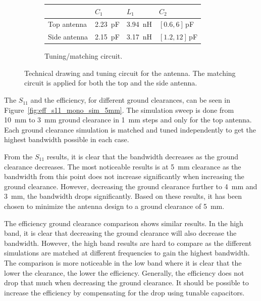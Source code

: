 \begin{figure}[htbp]
\begin{subfigure}[b]{0.49\linewidth}
\footnotesize
        \begin{tabular}{|l|l|l|l|}
            \hline
            & $C_1$ & $L_1$ & $C_2$ \\
            \hline
            Top antenna & \SI{2.23}{pF} & \SI{3.94}{nH} & $[0.6,6]\,$pF\\
            Side antenna & \SI{2.15}{pF} & \SI{3,17}{nH} & $[1.2,12]\,$pF\\
            \hline
        \end{tabular}
        \caption{Tuning/matching circuit.}
        \label{fig:ant1_tuning}
    \end{subfigure}
    \caption{Technical drawing and tuning circuit for the antenna.  The matching circuit is applied for both the top and the side antenna.}
    \label{fig:ant1techschem_6pf}
\end{figure}

The $S_{11}$ and the efficiency, for different ground clearances, can be seen in Figure~\ref{fig:eff_s11_mono_sim_5mm}.
The simulation sweep is done from \SI{10}{mm} to \SI{3}{mm} ground clearance in \SI{1}{mm} steps and only for the top antenna. Each ground clearance simulation is matched and tuned independently to get the highest bandwidth possible in each case.

From the $S_{11}$ results, it is clear that the bandwidth decreases as the ground clearance decreases. The most noticeable results is at \SI{5}{mm} clearance as the bandwidth from this point does not increase significantly when increasing the ground clearance. However, decreasing the ground clearance further to \SI{4}{mm} and \SI{3}{mm}, the bandwidth drops significantly. Based on these results, it has been chosen to minimize the antenna design to a ground clearance of \SI{5}{mm}.

The efficiency ground clearance comparison shows similar results. In the high band, it is clear that decreasing the ground clearance will also decrease the bandwidth. However, the high band results are hard to compare as the different simulations are matched at different frequencies to gain the highest bandwidth. The comparison is more noticeable in the low band where it is clear that the lower the clearance, the lower the efficiency. Generally, the efficiency does not drop that much when decreasing the ground clearance. It should be possible to increase the efficiency by compensating for the drop using tunable capacitors.  

